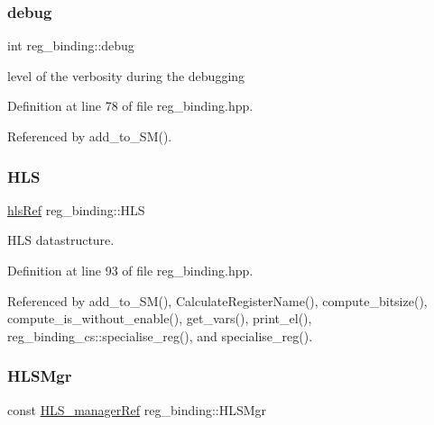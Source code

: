 \mbox{\label{classreg__binding_acd367be4c720d7bfbb8ffc17a3dd8e43}} 
\subsubsection{\texorpdfstring{debug}{debug}}
{\footnotesize\ttfamily int reg\+\_\+binding\+::debug\hspace{0.3cm}{\ttfamily [protected]}}



level of the verbosity during the debugging 



Definition at line 78 of file reg\+\_\+binding.\+hpp.



Referenced by add\+\_\+to\+\_\+\+S\+M().

\mbox{\label{classreg__binding_ab715d356b916ed5376a21628b556ef71}} 
\subsubsection{\texorpdfstring{H\+LS}{HLS}}
{\footnotesize\ttfamily \hyperlink{hls_8hpp_a75d0c73923d0ddfa28c4843a802c73a7}{hls\+Ref} reg\+\_\+binding\+::\+H\+LS\hspace{0.3cm}{\ttfamily [protected]}}



H\+LS datastructure. 



Definition at line 93 of file reg\+\_\+binding.\+hpp.



Referenced by add\+\_\+to\+\_\+\+S\+M(), Calculate\+Register\+Name(), compute\+\_\+bitsize(), compute\+\_\+is\+\_\+without\+\_\+enable(), get\+\_\+vars(), print\+\_\+el(), reg\+\_\+binding\+\_\+cs\+::specialise\+\_\+reg(), and specialise\+\_\+reg().

\mbox{\label{classreg__binding_a44cf9d4cabb4dcb2e0c5654607ebec24}} 
\subsubsection{\texorpdfstring{H\+L\+S\+Mgr}{HLSMgr}}
{\footnotesize\ttfamily const \hyperlink{hls__manager_8hpp_acd3842b8589fe52c08fc0b2fcc813bfe}{H\+L\+S\+\_\+manager\+Ref} reg\+\_\+binding\+::\+H\+L\+S\+Mgr\hspace{0.3cm}{\ttfamily [protected]}}



